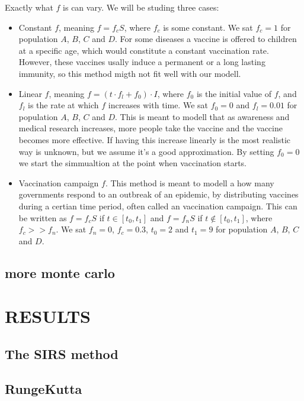 \documentclass[a4paper]{article}
\let\Oldsection\section
\renewcommand{\section}{\FloatBarrier\Oldsection}
\let\Oldsubsection\subsection
\renewcommand{\subsection}{\FloatBarrier\Oldsubsection}
\begin{document}
Exactly what $f$ is can vary. We will be studing three cases:
\begin{itemize}
	\item Constant $f$, meaning $f = f_c S$, where $f_c$ is some constant. We sat $f_c = 1$ for population $A$, $B$, $C$ and $D$. For some diseases a vaccine is offered to children at a specific age, which would constitute a constant vaccination rate. However, these vaccines usally induce a permanent or a long lasting immunity, so this method migth not fit well with our modell.
	\item Linear $f$, meaning $f = (t \cdot f_l + f_0) \cdot I$, where $f_0$ is the initial value of $f$, and $f_l$ is the rate at which $f$ increases with time. We sat $f_0 = 0$ and $f_l = 0.01$ for population $A$, $B$, $C$ and $D$. 
	This is meant to modell that as awareness and medical research increases, more people take the vaccine and the vaccine becomes more effective. If having this increase linearly is the most realistic way is unknown, but we assume it's a good approximation. By setting $f_0 = 0$ we start the simmualtion at the point when vaccination starts.
	\item Vaccination campaign $f$. This method is meant to modell a how many governments respond to an outbreak of an epidemic, by distributing vaccines during a certian time period, often called an vaccination campaign. This can be written as $f = f_c S$ if $t \in [t_0,t_1]$ and $f = f_n S$ if $t \notin [t_0,t_1]$, where $f_c >> f_n$. We sat $f_n=0$, $f_c=0.3$, $t_0=2$ and $t_1=9$ for population $A$, $B$, $C$ and $D$. 
\end{itemize}

\subsection{more monte carlo}

\section{RESULTS}

\subsection{The SIRS method}

\subsection{RungeKutta}
\end{document}

